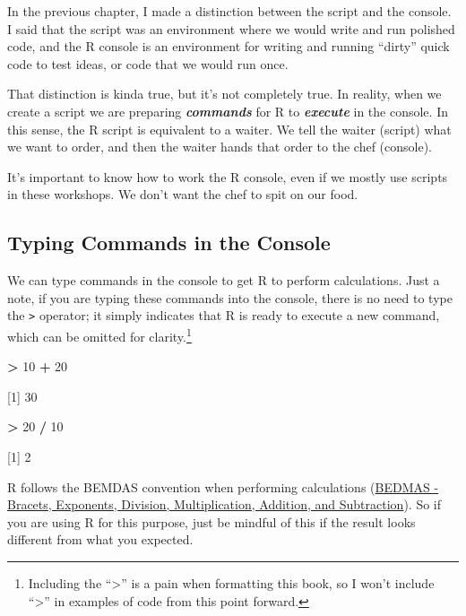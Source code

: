 \documentclass[
]{book}
\newenvironment{Shaded}{\begin{snugshade}}{\end{snugshade}}
\newcommand{\DecValTok}[1]{\textcolor[rgb]{0.00,0.00,0.81}{#1}}
\newcommand{\NormalTok}[1]{#1}
\newcommand{\SpecialCharTok}[1]{\textcolor[rgb]{0.81,0.36,0.00}{\textbf{#1}}}
\begin{document}
In the previous chapter, I made a distinction between the script and the console. I said that the script was an environment where we would write and run polished code, and the R console is an environment for writing and running ``dirty'' quick code to test ideas, or code that we would run once.

That distinction is kinda true, but it's not completely true. In reality, when we create a script we are preparing \textbf{\emph{commands}} for R to \textbf{\emph{execute}} in the console. In this sense, the R script is equivalent to a waiter. We tell the waiter (script) what we want to order, and then the waiter hands that order to the chef (console).

It's important to know how to work the R console, even if we mostly use scripts in these workshops. We don't want the chef to spit on our food.

\subsection{Typing Commands in the Console}\label{typing-commands-in-the-console}

We can type commands in the console to get R to perform calculations. Just a note, if you are typing these commands into the console, there is no need to type the \texttt{\textgreater{}} operator; it simply indicates that R is ready to execute a new command, which can be omitted for clarity.\footnote{Including the ``\textgreater{}'' is a pain when formatting this book, so I won't include ``\textgreater{}'' in examples of code from this point forward.}

\begin{Shaded}
\begin{Highlighting}[]
\SpecialCharTok{\textgreater{}} \DecValTok{10} \SpecialCharTok{+} \DecValTok{20}

\NormalTok{[}\DecValTok{1}\NormalTok{] }\DecValTok{30}
\end{Highlighting}
\end{Shaded}

\begin{Shaded}
\begin{Highlighting}[]
\SpecialCharTok{\textgreater{}} \DecValTok{20} \SpecialCharTok{/} \DecValTok{10}

\NormalTok{[}\DecValTok{1}\NormalTok{] }\DecValTok{2}
\end{Highlighting}
\end{Shaded}

R follows the BEMDAS convention when performing calculations (\href{https://www.tes.com/en-ie/teaching-resource/bidmas-bodmas-bedmas-bimdas-pemdas-permdas-11154272\#:~:text=\%E2\%80\%A2\%20BIMDAS\%20\%2D\%20Brackets\%2C\%20Indices\%2C,Multiplication\%2C\%20Division\%2C\%20Addition\%2C\%20Subtraction}{BEDMAS - Bracets, Exponents, Division, Multiplication, Addition, and Subtraction}). So if you are using R for this purpose, just be mindful of this if the result looks different from what you expected.
\end{document}

